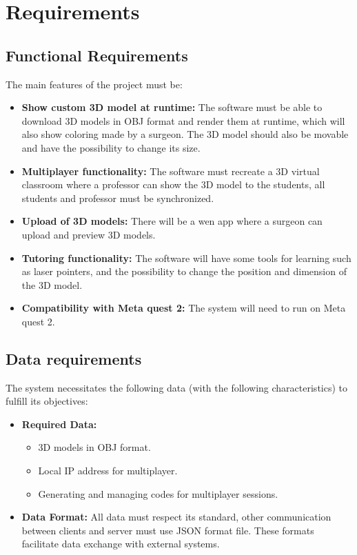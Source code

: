 
\chapter{Requirements}
\label{chp:Requirements}

\section{Functional Requirements}
\noindent
The main features of the project must be:

\begin{itemize}
  \item \textbf{Show custom 3D model at runtime:} The software must be able to download 3D models in OBJ format and render them at runtime, which will also show coloring made by a surgeon. The 3D model should also be movable and have the possibility to change its size. 
  \item \textbf{Multiplayer functionality:} The software must recreate a 3D virtual classroom where a professor can show the 3D model to the students, all students and professor must be synchronized.
  \item \textbf{Upload of 3D models:} There will be a wen app where a surgeon can upload and preview 3D models.
  \item \textbf{Tutoring functionality:} The software will have some tools for learning such as laser pointers, and the possibility to change the position and dimension of the 3D model.
  \item \textbf{Compatibility with Meta quest 2:} The system will need to run on Meta quest 2. 
\end{itemize}
\section{Data requirements}
\noindent
The system necessitates the following data (with the following characteristics) to fulfill its objectives:

\begin{itemize}
  \item \textbf{Required Data:} 
  \begin{itemize}
    \item 3D models in OBJ format.
    \item Local \ac{IP} address for multiplayer.
    \item Generating and managing codes for multiplayer sessions.
  \end{itemize}
  \item \textbf{Data Format:} All data must respect its standard, other communication between clients and server must use \ac{JSON} format file. These formats facilitate data exchange with external systems.
\end{itemize}

